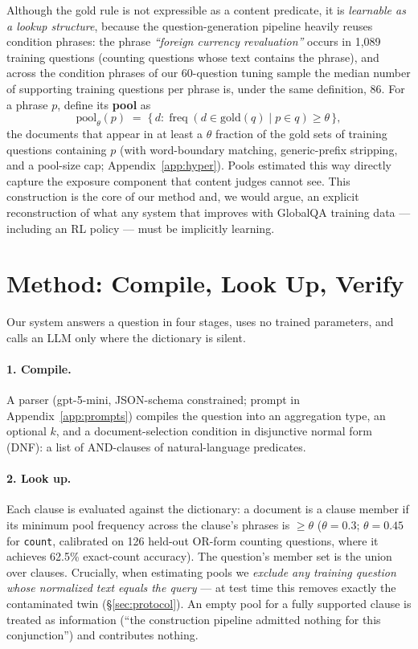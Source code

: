 \documentclass[11pt]{article}
\begin{document}
Although the gold rule is not expressible as a content predicate, it is \emph{learnable as a lookup structure}, because the question-generation pipeline heavily reuses condition phrases: the phrase \emph{``foreign currency revaluation''} occurs in 1{,}089 training questions (counting questions whose text contains the phrase), and across the condition phrases of our 60-question tuning sample the median number of supporting training questions per phrase is, under the same definition, 86. For a phrase $p$, define its \textbf{pool} as
\[
\mathrm{pool}_\theta(p) \;=\; \{\, d : \operatorname{freq}(d \in \mathrm{gold}(q) \mid p \in q) \geq \theta \,\},
\]
the documents that appear in at least a $\theta$ fraction of the gold sets of training questions containing $p$ (with word-boundary matching, generic-prefix stripping, and a pool-size cap; Appendix~\ref{app:hyper}). Pools estimated this way directly capture the exposure component that content judges cannot see. This construction is the core of our method and, we would argue, an explicit reconstruction of what any system that improves with GlobalQA training data --- including an RL policy --- must be implicitly learning.

\section{Method: Compile, Look Up, Verify}
\label{sec:method}

Our system answers a question in four stages, uses no trained parameters, and calls an LLM only where the dictionary is silent.

\paragraph{1. Compile.} A parser (gpt-5-mini, JSON-schema constrained; prompt in Appendix~\ref{app:prompts}) compiles the question into an aggregation type, an optional $k$, and a document-selection condition in disjunctive normal form (DNF): a list of AND-clauses of natural-language predicates.

\paragraph{2. Look up.} Each clause is evaluated against the dictionary: a document is a clause member if its minimum pool frequency across the clause's phrases is $\geq \theta$ ($\theta{=}0.3$; $\theta{=}0.45$ for \texttt{count}, calibrated on 126 held-out OR-form counting questions, where it achieves 62.5\% exact-count accuracy). The question's member set is the union over clauses. Crucially, when estimating pools we \emph{exclude any training question whose normalized text equals the query} --- at test time this removes exactly the contaminated twin (\S\ref{sec:protocol}). An empty pool for a fully supported clause is treated as information (``the construction pipeline admitted nothing for this conjunction'') and contributes nothing.
\end{document}

